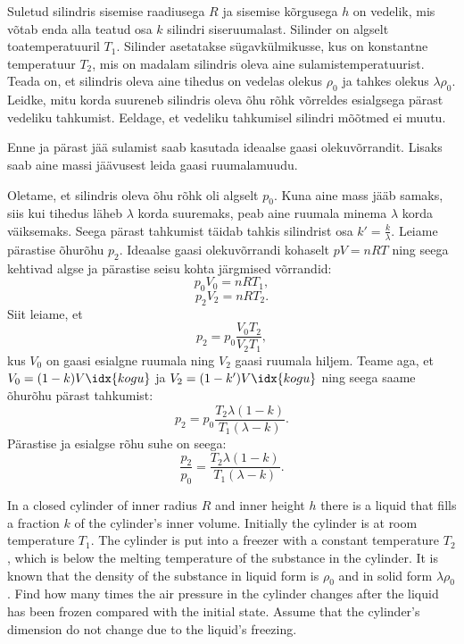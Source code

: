 
Suletud silindris sisemise raadiusega $R$ ja sisemise kõrgusega $h$ on vedelik, mis võtab enda alla teatud osa $k$ silindri siseruumalast. Silinder on algselt toatemperatuuril $T_{1}$. Silinder asetatakse sügavkülmikusse, kus on konstantne temperatuur $T_{2}$, mis on madalam silindris oleva aine sulamistemperatuurist. Teada on, et silindris oleva aine tihedus on vedelas olekus $\rho_0$ ja tahkes olekus $\lambda\rho_0$. Leidke, mitu korda suureneb silindris oleva õhu rõhk võrreldes esialgsega pärast vedeliku tahkumist. Eeldage, et vedeliku tahkumisel silindri mõõtmed ei muutu.

\hint
Enne ja pärast jää sulamist saab kasutada ideaalse gaasi olekuvõrrandit. Lisaks saab aine massi jäävusest leida gaasi ruumalamuudu.

\solu
Oletame, et silindris oleva õhu rõhk oli algselt $p_{0}$. Kuna aine mass jääb samaks, siis kui tihedus läheb $\lambda$ korda suuremaks, peab aine ruumala minema $\lambda$ korda väiksemaks. Seega pärast tahkumist täidab tahkis silindrist osa $k'=\frac{k}{\lambda}$. Leiame pärastise õhurõhu $p_{2}$. Ideaalse gaasi olekuvõrrandi kohaselt $pV=nRT$ ning seega kehtivad algse ja pärastise seisu kohta järgmised võrrandid:
\begin{equation*}
p_{0}V_{0}=nRT_{1},
\end{equation*}
\begin{equation*}
p_{2}V_{2}=nRT_{2}.
\end{equation*}
Siit leiame, et
\[
p_{2}=p_{0}\frac{V_{0}T_{2}}{V_{2}T_{1}},
\]
kus $V_{0}$ on gaasi esialgne ruumala ning $V_{2}$ gaasi ruumala hiljem. Teame aga, et $V_{0}=(1-k)V\idx{kogu}$ ja $V_{2}=(1-k')V\idx{kogu}$ ning seega saame õhurõhu pärast tahkumist:
\begin{equation*}
p_{2}=p_{0}\frac{T_{2}\lambda (1-k)}{T_{1}(\lambda-k)}.
\end{equation*}
Pärastise ja esialgse rõhu suhe on seega:
\begin{equation*}
\frac{p_{2}}{p_{0}}=\frac{T_{2}\lambda(1-k)}{T_{1}(\lambda-k)}.
\end{equation*}

In a closed cylinder of inner radius $R$ and inner height $h$ there is a liquid that fills a fraction $k$ of the cylinder's inner volume. Initially the cylinder is at room temperature $T_{1}$. The cylinder is put into a freezer with a constant temperature $T_{2}$, which is below the melting temperature of the substance in the cylinder. It is known that the density of the substance in liquid form is $\rho_0$ and in solid form $\lambda\rho_0$. Find how many times the air pressure in the cylinder changes after the liquid has been frozen compared with the initial state. Assume that the cylinder's dimension do not change due to the liquid’s freezing.

